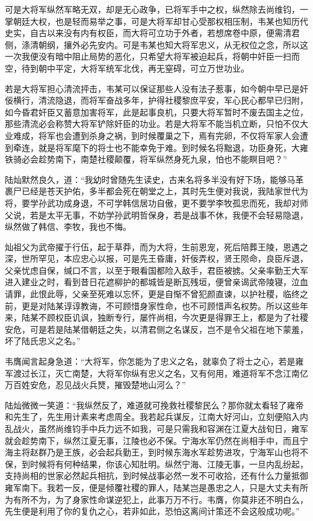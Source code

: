 可是大将军纵然军略无双，却是无心政争，已将军手中之权，纵然除去尚维钧，一掌朝廷大权，也是轻而易举之事，可是大将军却甘心受那权相压制，韦某也知历代史实，自古以来没有内有权臣，而大将可立功于外者，若想席卷中原，便需清君侧，涤清朝纲，攘外必先安内。可是韦某也知大将军忠义，从无权位之念，所以这一次我便没有暗中阻止局势的恶化，只希望大将军被迫起兵，将朝中奸臣一扫而空，待到朝中平定，大将军统军北伐，再无窒碍，可立万世功业。

若是大将军担心清流抨击，韦某可以保证那些人没有法子惹事，如今朝中早已是奸佞横行，清流隐退，而将军奋战多年，护得社稷黎庶平安，军心民心都早已归附，如今昏君奸臣又蓄意加害将军，此是起事良机，只要大将军暂时不废去国主之位，那些清流必会称赞大将军铲除奸臣的功业。若是大将军不能当机立断，只怕不仅大业难成，将军也会遭到杀身之祸，到时候覆巢之下，焉有完卵，不仅将军家人会遭到牵连，就是将军麾下的将士也不能幸免于难。到时候名将黜退，功臣身死，大雍铁骑必会趁势南下，南楚社稷颠覆，将军纵然身死九泉，怕也不能瞑目吧？”

陆灿默然良久，道：“我幼时曾随先生读史，古来名将多半没有好下场，能够马革裹尸已经是苍天护佑，多半都会死在朝堂之上，其时先生便对我说，我陆家世代为将，要学孙武功成身退，不可学韩信居功自傲，更不要学李牧孤忠而死，我却对师父说，若是太平无事，不妨学孙武明哲保身，若是战事不休，我便不会轻易隐退，纵然做了韩信、李牧，我也不悔。

灿祖父为武帝擢于行伍，起于草莽，而为大将，生前恩宠，死后陪葬王陵，恩遇之深，世所罕见，本应忠心以报，可是先王昏庸，奸佞弄权，贤王陨命，良臣斥退，父亲忧虑自保，缄口不言，以至于眼看国都险入敌手，君臣被掳。父亲率勤王大军进入建业之时，看到昔日花遮柳护的都城皆是断瓦残垣，便曾亲谒武帝陵寝，泣血请罪，此恨此辱，父亲至死难以忘怀，更是自惭不曾犯颜直谏，以护社稷，临终之前，更是对陆某谆谆教诲，不可顾惜身家性命，也不可顾惜声名权势。所以这些年来，陆某不顾权臣讥讽，独断专行，屡忤尚相，今次更是得罪王上，都是为了社稷安危，可是若是陆某借朝廷之失，以清君侧之名谋反，岂不是令父祖在地下蒙羞，坏了陆氏忠义之名。”

韦膺闻言起身急道：“大将军，你怎能为了忠义之名，就辜负了将士之心，若是雍军渡过长江，灭亡南楚，大将军你纵有忠义之名，又有何用，难道将军不念江南亿万百姓安危，忍见战火兵燹，摧毁楚地山河么？”

陆灿微微一笑道：“我纵然反了，难道就可挽救社稷黎民么？那你就太看轻了雍帝和先生了，先生用计素来考虑周全。我若起兵谋反，江南大好河山，立刻便陷入内乱战火，虽然尚维钧手中兵力远不如我，可是只需我和容渊在江夏大战旬日，雍军就会趁势南下，纵然江夏无事，江陵也必不保。宁海水军仍然在尚相手中，而且宁海主将赵群乃是王族，必会起兵勤王，到时候东海水军趁势进攻，宁海军山也将不保，到时候将有何种结果，你该心知肚明。纵然宁海、江陵无事，一旦内乱纷起，支持尚相的世家必然起兵相抗，到时候战事必然一发不可收拾，还有什么力量抵御雍军南下。我若一反，便是倾覆社稷的罪人，陆某岂是愚忠之人，只是大丈夫有所为有所不为，为了身家性命谋逆犯上，此事万万不行。韦膺，你莫非还不明白么，先生便是利用了你的复仇之心，若非如此，恐怕这离间计策还不会这般成功呢。”

